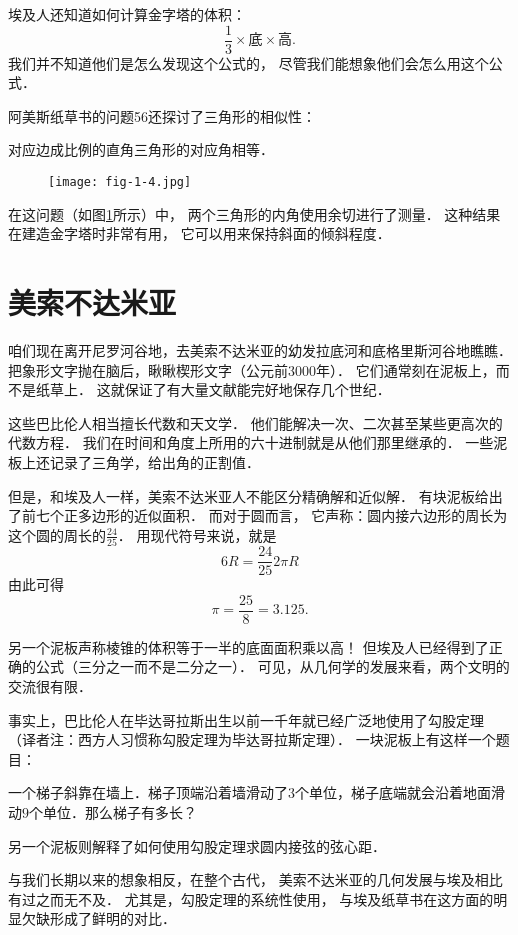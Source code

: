\documentclass[cn,fancy,blue,11pt]{elegantbook}
\begin{document}
埃及人还知道如何计算金字塔的体积：
\[\frac{1}{3}\times\textrm{底}\times\textrm{高}.\]
我们并不知道他们是怎么发现这个公式的，
尽管我们能想象他们会怎么用这个公式．

阿美斯纸草书的问题56还探讨了三角形的相似性：
\begin{framed}
	对应边成比例的直角三角形的对应角相等．
\end{framed}
\begin{figure}[htbp]
	\centering
	\texttt{[image: fig-1-4.jpg]}
	\caption{\label{fig:1-4}}
\end{figure}
在这问题（如图\ref{fig:1-4}所示）中，
两个三角形的内角使用余切进行了测量．
这种结果在建造金字塔时非常有用，
它可以用来保持斜面的倾斜程度．

\section{美索不达米亚}

咱们现在离开尼罗河谷地，去美索不达米亚的幼发拉底河和底格里斯河谷地瞧瞧．
把象形文字抛在脑后，瞅瞅楔形文字（公元前3000年）．
它们通常刻在泥板上，而不是纸草上．
这就保证了有大量文献能完好地保存几个世纪．

这些巴比伦人相当擅长代数和天文学．
他们能解决一次、二次甚至某些更高次的代数方程．
我们在时间和角度上所用的六十进制就是从他们那里继承的．
一些泥板上还记录了三角学，给出角的正割值．

但是，和埃及人一样，美索不达米亚人不能区分精确解和近似解．
有块泥板给出了前七个正多边形的近似面积．
而对于圆而言，
它声称：圆内接六边形的周长为这个圆的周长的$\frac{24}{25}$．
用现代符号来说，就是
\[6R=\frac{24}{25}2\pi R\]
由此可得
\[\pi=\frac{25}{8}=3.125.\]

另一个泥板声称棱锥的体积等于一半的底面面积乘以高！
但埃及人已经得到了正确的公式（三分之一而不是二分之一）．
可见，从几何学的发展来看，两个文明的交流很有限．

事实上，巴比伦人在毕达哥拉斯出生以前一千年就已经广泛地使用了勾股定理
（译者注：西方人习惯称勾股定理为毕达哥拉斯定理）．
一块泥板上有这样一个题目：
\begin{framed}
	一个梯子斜靠在墙上．梯子顶端沿着墙滑动了$3$个单位，梯子底端就会沿着地面滑动$9$个单位．那么梯子有多长？
\end{framed}
另一个泥板则解释了如何使用勾股定理求圆内接弦的弦心距．

与我们长期以来的想象相反，在整个古代，
美索不达米亚的几何发展与埃及相比有过之而无不及．
尤其是，勾股定理的系统性使用，
与埃及纸草书在这方面的明显欠缺形成了鲜明的对比．
\end{document}
